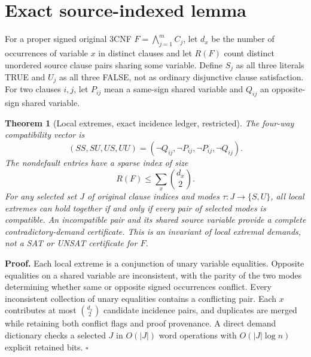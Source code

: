 \documentclass[11pt]{article}
\newtheorem{theorem}{Theorem}
\begin{document}
\section*{Exact source-indexed lemma}
For a proper signed original 3CNF $F=\bigwedge_{j=1}^m C_j$, let $d_x$ be the number of occurrences of variable $x$ in distinct clauses and let $R(F)$ count distinct unordered source clause pairs sharing some variable. Define $S_j$ as all three literals TRUE and $U_j$ as all three FALSE, not as ordinary disjunctive clause satisfaction. For two clauses $i,j$, let $P_{ij}$ mean a same-sign shared variable and $Q_{ij}$ an opposite-sign shared variable.
\begin{theorem}[Local extremes, exact incidence ledger, restricted]
The four-way compatibility vector is
\[
(SS,SU,US,UU)=(\neg Q_{ij},\neg P_{ij},\neg P_{ij},\neg Q_{ij}).
\]
The nondefault entries have a sparse index of size
\[
R(F)\le\sum_x\binom{d_x}{2}.
\]
For any selected set $J$ of original clause indices and modes $\tau:J\to\{S,U\}$, all local extremes can hold together if and only if every pair of selected modes is compatible. An incompatible pair and its shared source variable provide a complete contradictory-demand certificate. This is an invariant of local extremal demands, not a SAT or UNSAT certificate for $F$.
\end{theorem}
\noindent\textbf{Proof.} Each local extreme is a conjunction of unary variable equalities. Opposite equalities on a shared variable are inconsistent, with the parity of the two modes determining whether same or opposite signed occurrences conflict. Every inconsistent collection of unary equalities contains a conflicting pair. Each $x$ contributes at most $\binom{d_x}{2}$ candidate incidence pairs, and duplicates are merged while retaining both conflict flags and proof provenance. A direct demand dictionary checks a selected $J$ in $O(|J|)$ word operations with $O(|J|\log n)$ explicit retained bits. \hfill$\square$
\end{document}
